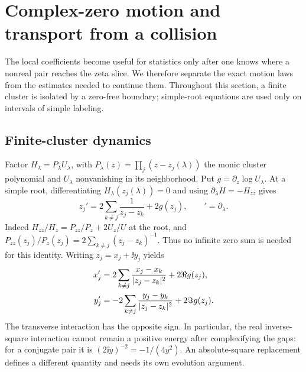 \section{Complex-zero motion and transport from a collision}
\label{sec:complex-dynamics}

The local coefficients become useful for statistics only after one knows
where a nonreal pair reaches the zeta slice. We therefore separate the
exact motion laws from the estimates needed to continue them. Throughout
this section, a finite cluster is isolated by a zero-free boundary;
simple-root equations are used only on intervals of simple labeling.

\subsection{Finite-cluster dynamics}
Factor \(H_\lambda=P_\lambda U_\lambda\), with
\(P_\lambda(z)=\prod_j(z-z_j(\lambda))\) the monic cluster polynomial
and \(U_\lambda\) nonvanishing in its neighborhood. Put
\(g=\partial_z\log U_\lambda\). At a simple root, differentiating
\(H_\lambda(z_j(\lambda))=0\) and using
\(\partial_\lambda H=-H_{zz}\) gives
\begin{equation}\label{eq:complex-root-motion}
 z_j'=2\sum_{k\ne j}\frac1{z_j-z_k}+2g(z_j),
 \qquad {}'=\partial_\lambda.
\end{equation}
Indeed \(H_{zz}/H_z=P_{zz}/P_z+2U_z/U\) at the root, and
\(P_{zz}(z_j)/P_z(z_j)=2\sum_{k\ne j}(z_j-z_k)^{-1}\).
Thus no infinite zero sum is needed for this identity. Writing
\(z_j=x_j+\ii y_j\) yields
\begin{align}
 x_j'&=2\sum_{k\ne j}\frac{x_j-x_k}{|z_j-z_k|^2}
                              +2\Re g(z_j),\notag\\
 y_j'&=-2\sum_{k\ne j}\frac{y_j-y_k}{|z_j-z_k|^2}
                              +2\Im g(z_j).
 \label{eq:planar-root-motion}
\end{align}
The transverse interaction has the opposite sign. In particular,
the real inverse-square interaction cannot remain a positive energy
after complexifying the gaps: for a conjugate pair it is
\((2\ii y)^{-2}=-1/(4y^2)\). An absolute-square replacement defines
a different quantity and needs its own evolution argument.

